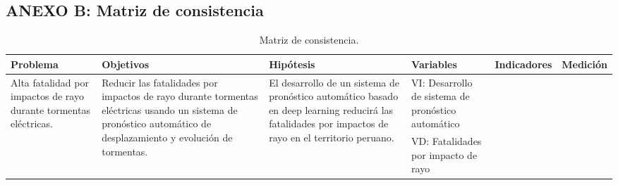 \begin{sidewaysfigure}
\section*{ANEXO B: Matriz de consistencia}
{}

\renewcommand\thetable{B.\arabic{table}}  
\setcounter{table}{0} 

\begin{table}[H]
  \centering
  \label{tab:matriz_consistencia}
  \caption{Matriz de consistencia.}
  \begin{tabular}{p{2.5cm}|p{4.25cm}|p{4cm}|p{3.25cm}|p{3.5cm}|p{3cm}}
  Problema                                                                           & Objetivos                                                                                                                                                                           & Hipótesis                                                                                                                                                             & Variables                                          & Indicadores                                             & Medición                              \\ \hline
  \multirow{2}{2.5cm}{Alta fatalidad por impactos de rayo durante tormentas eléctricas.} & \multirow{2}{4.25cm}{Reducir las fatalidades por impactos de rayo durante tormentas eléctricas  usando un sistema de pronóstico automático de desplazamiento y evolución de  tormentas.} & \multirow{2}{4cm}{El desarrollo de un sistema de pronóstico automático basado en deep learning reducirá las fatalidades por impactos de rayo en el territorio peruano.} & VI: Desarrollo de sistema de pronóstico automático \newline &                                                         &                                       \\
                                                                                     &                                                                                                                                                                                     &                                                                                                                                                                       & VD: Fatalidades por impacto de rayo  \newline               &                                                         &                                       \\ \hline

\end{tabular}
\end{table}
\end{sidewaysfigure}
